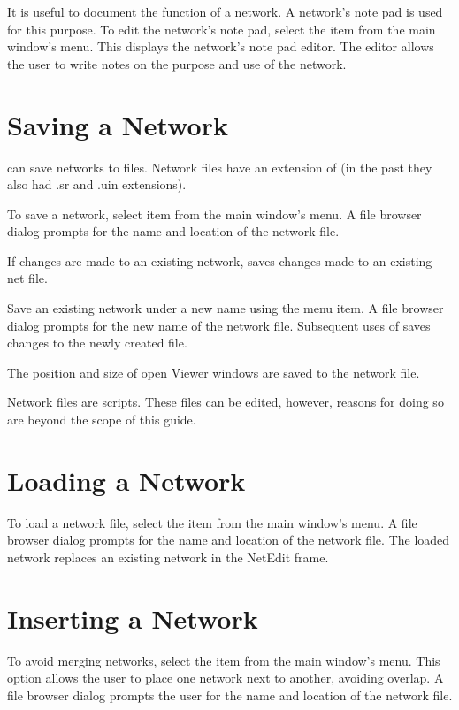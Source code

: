 It is useful to document the function of a network.  A network's note
pad is used for this purpose.  To edit the network's note pad,
select the  item from the main window's 
menu.  This displays the network's note pad editor.  The editor
allows the user to write notes on the purpose and use of the network.

\section{Saving a Network}
\label{sec:savenet}

\sr{} can save networks to files.  Network files have an extension of
 (in the past they also had .sr and .uin
extensions).  

To save a network, select item  from the main window's
 menu.  A file browser dialog prompts for the
name and location of the network file.

If changes are made to an existing network,  saves
changes made to an existing net file.

Save an existing network under a new name using the  menu item.  A file browser dialog prompts for the new name of
the network file.  Subsequent uses of  saves changes
to the newly created file.

The position and size of open Viewer windows are saved to
the network file.

Network files are   scripts.
These files can be edited, however, reasons for doing so are beyond
the scope of this guide.

\section{Loading a Network}
\label{sec:opennet}

To load a network file, select the  item from the main
window's  menu.   A file browser dialog prompts for the
name and location of the network file.  The loaded network replaces an
existing network in the NetEdit frame.

\section{Inserting a Network}
\label{sec:insertnetwork}

To avoid merging networks, select the
 item from the main window's  menu. This
option allows the user to place one \sr{} network next to another,
avoiding overlap.  A file browser dialog prompts the user for the name and
location of the network file.

